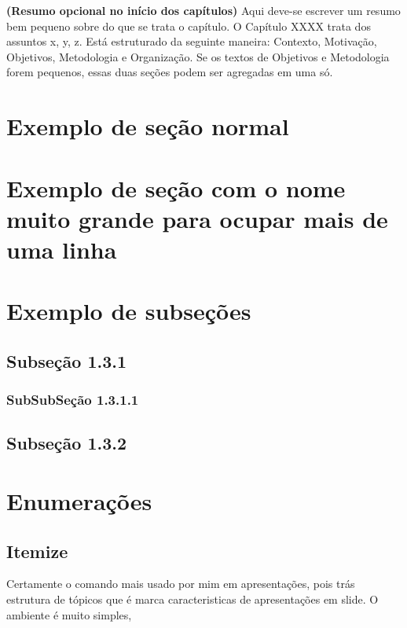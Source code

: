 \normalsize
\begin{resumoCapitulo}
\textbf{(Resumo opcional no início dos capítulos)} Aqui deve-se escrever um resumo bem pequeno sobre do que se trata o capítulo. O Capítulo XXXX trata dos assuntos x, y, z. Está estruturado da seguinte maneira: Contexto, Motivação, Objetivos, Metodologia e Organização. Se os textos de Objetivos e Metodologia forem pequenos, essas duas seções podem ser agregadas em uma só.
\end{resumoCapitulo}

\section{Exemplo de seção normal} \label{sec:Cap1-Secao1}
\lipsum[1]

\section{Exemplo de seção com o nome muito grande para ocupar mais de uma linha} \label{sec:Cap1-Secao2}
\lipsum[1]

\section{Exemplo de subseções} \label{sec:Cap1-Secao3}

\subsection{Subseção 1.3.1} \label{sec:Cap1-Secao1.3.1}
\lipsum[1]

\subsubsection{SubSubSeção 1.3.1.1} \label{sec:Cap1-Secao1.3.1.1}
\lipsum[1]

\subsection{Subseção 1.3.2} \label{sec:Cap1-Secao1.3.2}
\lipsum[1]

\section{Enumerações} \label{sec:Cap1-Secao4}
\subsection{Itemize}
Certamente o comando mais usado por mim em apresentações, pois trás estrutura de tópicos que é marca caracteristicas de apresentações em slide. O ambiente é muito simples,

